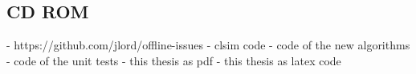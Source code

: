 
\subsection{CD ROM}

-  https://github.com/jlord/offline-issues
- clsim code
- code of the new algorithms
- code of the unit tests
- this thesis as pdf
- this thesis as latex code
